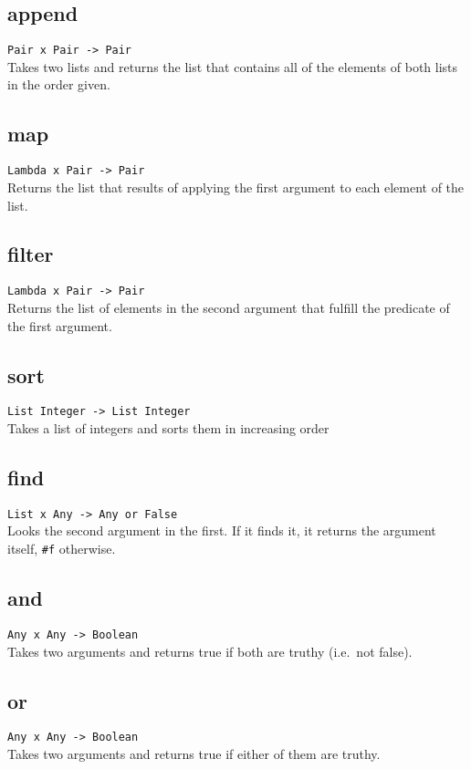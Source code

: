 \subsection*{append}
\texttt{Pair x Pair -> Pair}\\
\noindent Takes two lists and returns the list that contains all of the elements of both lists in the order
given.

\subsection*{map}
\texttt{Lambda x Pair -> Pair}\\
\noindent Returns the list that results of applying the first argument to each element of the list.

\subsection*{filter}
\texttt{Lambda x Pair -> Pair}\\
\noindent Returns the list of elements in the second argument that fulfill the predicate of the first argument.

\subsection*{sort}
\texttt{List Integer -> List Integer}\\
\noindent Takes a list of integers and sorts them in increasing order

\subsection*{find}
\texttt{List x Any -> Any or False}\\
\noindent Looks the second argument in the first. If it finds it, it returns the argument itself, \texttt{\#f}
otherwise.

\subsection*{and}
\texttt{Any x Any -> Boolean}\\
\noindent Takes two arguments and returns true if both are truthy (i.e.\ not false).

\subsection*{or}
\texttt{Any x Any -> Boolean}\\
\noindent Takes two arguments and returns true if either of them are truthy.
